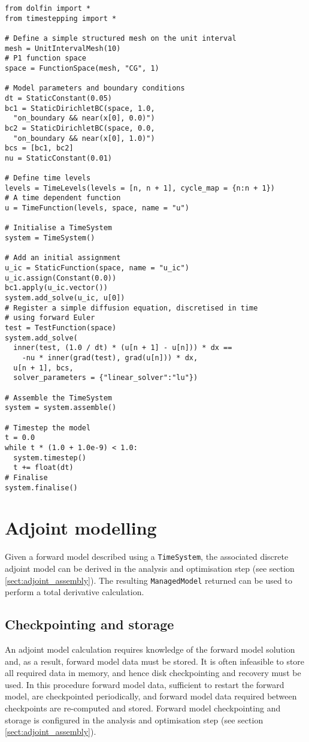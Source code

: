 \documentclass[a4paper]{book}
\begin{document}
\begin{lstlisting}
from dolfin import *
from timestepping import *

# Define a simple structured mesh on the unit interval
mesh = UnitIntervalMesh(10)
# P1 function space
space = FunctionSpace(mesh, "CG", 1)

# Model parameters and boundary conditions
dt = StaticConstant(0.05)
bc1 = StaticDirichletBC(space, 1.0,
  "on_boundary && near(x[0], 0.0)")
bc2 = StaticDirichletBC(space, 0.0,
  "on_boundary && near(x[0], 1.0)")
bcs = [bc1, bc2]
nu = StaticConstant(0.01)

# Define time levels
levels = TimeLevels(levels = [n, n + 1], cycle_map = {n:n + 1})
# A time dependent function
u = TimeFunction(levels, space, name = "u")

# Initialise a TimeSystem
system = TimeSystem()

# Add an initial assignment
u_ic = StaticFunction(space, name = "u_ic")
u_ic.assign(Constant(0.0))
bc1.apply(u_ic.vector())
system.add_solve(u_ic, u[0])
# Register a simple diffusion equation, discretised in time
# using forward Euler
test = TestFunction(space)
system.add_solve(
  inner(test, (1.0 / dt) * (u[n + 1] - u[n])) * dx ==
    -nu * inner(grad(test), grad(u[n])) * dx,
  u[n + 1], bcs,
  solver_parameters = {"linear_solver":"lu"})

# Assemble the TimeSystem
system = system.assemble()

# Timestep the model
t = 0.0
while t * (1.0 + 1.0e-9) < 1.0:
  system.timestep()
  t += float(dt)
# Finalise
system.finalise()
\end{lstlisting}

\section{Adjoint modelling}

Given a forward model described using a \verb+TimeSystem+, the associated
discrete adjoint model can be derived in the analysis and optimisation step (see
section \ref{sect:adjoint_assembly}). The resulting \verb+ManagedModel+
returned can be used to perform a total derivative calculation.

\subsection{Checkpointing and storage}

An adjoint model calculation requires knowledge of the forward model solution
and, as a result, forward model data must be stored. It is often infeasible to
store all required data in memory, and hence disk checkpointing and recovery
must be used. In this procedure forward model data, sufficient to restart the
forward model, are checkpointed periodically, and forward model data required
between checkpoints are re-computed and stored. Forward model checkpointing and
storage is configured in the analysis and optimisation step (see section
\ref{sect:adjoint_assembly}).
\end{document}
